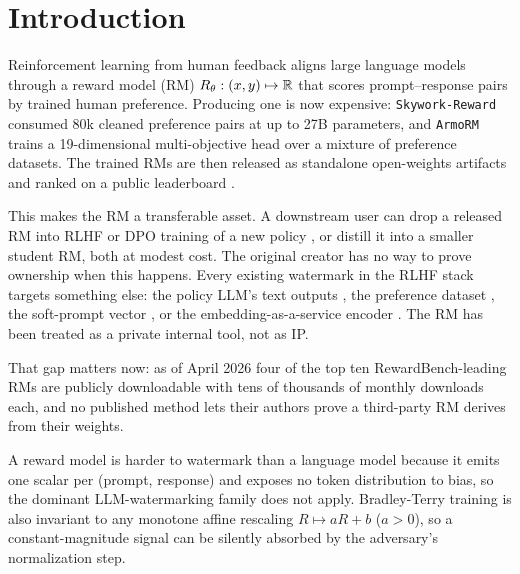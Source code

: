 \section{Introduction}
\label{sec:introduction}

Reinforcement learning from human feedback
\citep{ouyang2022training,bai2022training} aligns large language
models through a reward model (RM) $R_{\theta} : (x, y) \mapsto
\mathbb{R}$ that scores prompt--response pairs by trained human
preference. Producing one is now expensive:
\texttt{Skywork-Reward} \citep{liu2024skywork} consumed 80k
cleaned preference pairs at up to 27B parameters, and
\texttt{ArmoRM} \citep{wang2024interpretable} trains a
19-dimensional multi-objective head over a mixture of preference
datasets. The trained RMs are then released as standalone
open-weights artifacts and ranked on a public leaderboard
\citep{lambert2024rewardbench}.

This makes the RM a transferable asset. A downstream user can
drop a released RM into RLHF or DPO training of a new policy
\citep{rafailov2023direct}, or distill it into a smaller student
RM, both at modest cost. The original creator has no way to prove
ownership when this happens. Every existing watermark in the RLHF
stack targets something else: the policy LLM's text outputs
\citep{kirchenbauer2023watermark,christ2023undetectable}, the
preference dataset \citep{lou2025prefercare}, the soft-prompt
vector \citep{yang2025promptcos}, or the embedding-as-a-service
encoder \citep{peng2023embmarker}. The RM has been treated as a
private internal tool, not as IP.

That gap matters now: as of April 2026 four of the top ten
RewardBench-leading RMs are publicly downloadable with tens of
thousands of monthly downloads each, and no published method
lets their authors prove a third-party RM derives from their
weights.

A reward model is harder to watermark than a language model
because it emits one scalar per (prompt, response) and exposes
no token distribution to bias, so the dominant LLM-watermarking
family \citep{kirchenbauer2023watermark,christ2023undetectable}
does not apply. Bradley-Terry training is also invariant to any
monotone affine rescaling $R \mapsto aR + b$ ($a > 0$), so a
constant-magnitude signal can be silently absorbed by the
adversary's normalization step.

